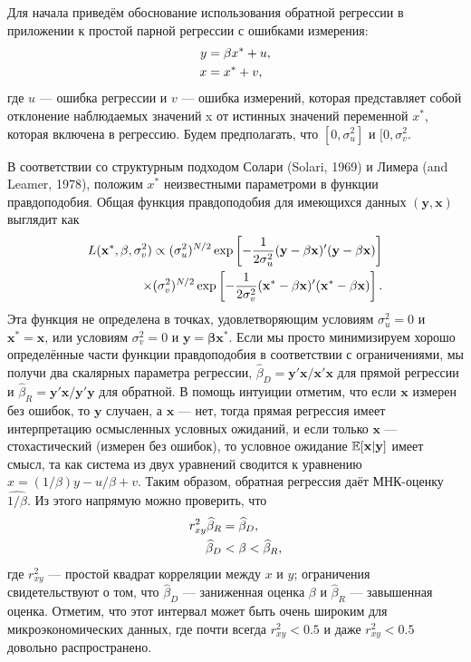 Для начала приведём обоснование использования обратной регрессии в приложении к простой парной регрессии с ошибками измерения:
\begin{align}
y&=\beta x^*+u, \\
x&=x^*+v, \notag
\end{align}
где $u$ --– ошибка регрессии  и $v$ --– ошибка измерений, которая представляет собой отклонение наблюдаемых значений x от истинных значений переменной $x^*$, которая включена в регрессию. Будем предполагать, что $ [0,\sigma^2_u]$ и $ [0,\sigma^2_v$.

В соответствии со структурным подходом Солари (Solari, 1969) и Лимера (and Leamer, 1978), положим $x^*$ неизвестными параметроми в функции правдоподобия. Общая функция правдоподобия для имеющихся данных $(\mathbf{y}, \mathbf{x})$ выглядит как
\begin{align}
L(\mathbf{x^*}, \beta, \sigma^2_v)\propto ( \sigma^2_u)^{N/2} \exp \left[ -\frac{1}{2\sigma^2_u}(\mathbf{y-\beta x})'(\mathbf{y-\beta x}) \right] \notag \\
\times ( \sigma^2_v)^{N/2} \exp \left[ -\frac{1}{2\sigma^2_v}(\mathbf{x^*-\beta x})'(\mathbf{x^*-\beta x}) \right].
\end{align}
Эта функция не определена в точках, удовлетворяющим условиям $\sigma^2_u=0$ и $\mathbf{x^*}=\mathbf{x}$, или условиям $\sigma^2_v=0$ и $\mathbf{y}=\mathbf{\beta x^*}$. Если мы просто минимизируем хорошо определённые части функции правдоподобия в соответствии с ограничениями, мы получи два скалярных параметра регрессии, $\widehat{\beta}_D=\mathbf{y'x/x'x}$ для прямой регрессии и $\widehat{\beta}_R=\mathbf{y'x/y'y}$ для обратной. В помощь интуиции отметим, что если $\mathbf{x}$ измерен без ошибок, то $\mathbf{y}$ случаен, а $\mathbf{x}$ --- нет, тогда прямая регрессия имеет интерпретацию осмысленных условных ожиданий, и если только $\mathbf{x}$ --- стохастический (измерен без ошибок), то условное ожидание $\mathbb{E}[\mathbf{x|y}]$ имеет смысл, та как система из двух уравнений сводится к уравнению $x=(1/\beta)y-u/\beta+v$. Таким образом, обратная регрессия даёт МНК-оценку $\widehat{1/\beta}$. Из этого напрямую можно проверить, что
\begin{align}
r^2_{xy} \widehat{\beta}_R&=\widehat{\beta}_D, \\
\widehat{\beta}_D &< \beta < \widehat{\beta}_R, \notag
\end{align}
где $r^2_{xy}$ --- простой квадрат корреляции между $x$ и $y$; ограничения свидетельствуют о том, что $\widehat{\beta}_D$ --- заниженная оценка $\beta$ и $\widehat{\beta}_R$ --- завышенная оценка. Отметим, что этот интервал может быть очень широким для микроэкономических данных, где почти всегда $r^2_{xy}<0.5$ и даже $r^2_{xy}<0.5$ довольно распространено.

